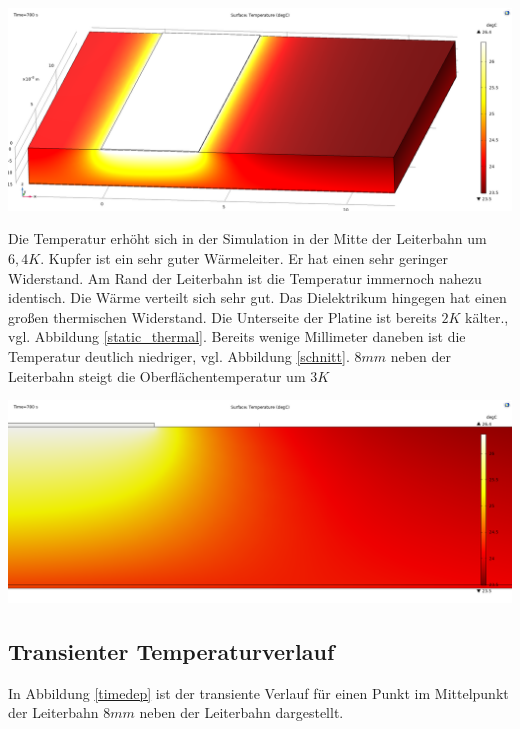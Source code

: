 \documentclass[10pt,a4paper,oneside,abstracton]{scrartcl}
\newenvironment{Figure}
  {\par\medskip\noindent\minipage{\linewidth}}
  {\endminipage\par\medskip}
\begin{document}
\begin{multicols}{2}
\begin{Figure}
	\includegraphics[width=\textwidth]{Bilder/Thermal_static.png}
	\label{static_thermal}
\end{Figure}
\noindent
Die Temperatur erhöht sich in der Simulation in der Mitte der Leiterbahn um $6,4 K$.
Kupfer ist ein sehr guter Wärmeleiter. Er hat einen sehr geringer Widerstand. 
\newline
Am Rand der Leiterbahn ist die Temperatur immernoch nahezu identisch. Die Wärme verteilt sich sehr gut. 
Das Dielektrikum hingegen hat einen großen thermischen Widerstand. 
Die Unterseite der Platine ist bereits $2K$ kälter., vgl. Abbildung \ref{static_thermal}. 
\newline
Bereits wenige Millimeter daneben ist die Temperatur deutlich niedriger, vgl. Abbildung \ref{schnitt}.
$8 mm$ neben der Leiterbahn steigt die Oberflächentemperatur um $3K$
\begin{Figure}
	\includegraphics[width=\textwidth]{Bilder/schnitt.png}
	\label{schnitt}
\end{Figure}

\subsection{Transienter Temperaturverlauf}
In Abbildung \ref{timedep} ist der transiente Verlauf für einen Punkt im Mittelpunkt der Leiterbahn 
$8 mm$ neben der Leiterbahn dargestellt.


\end{multicols}
\end{document}
